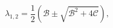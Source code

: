 \begin{equation}\label{lam}
 \lambda_{1,2}=\frac12\left(\mathcal{B}
 \pm\sqrt{\mathcal{B}^2+4\mathcal{C}}\right),
\end{equation}

